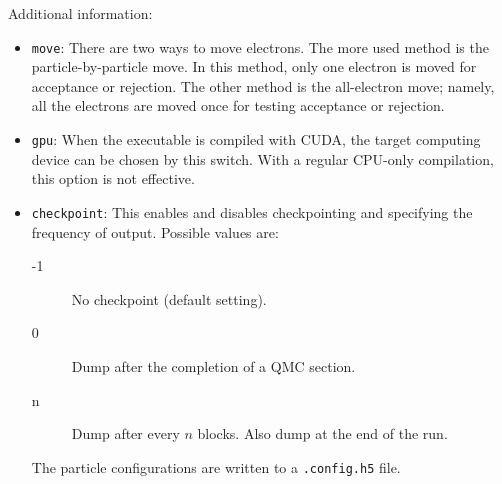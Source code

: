 Additional information:
\begin{itemize}
\item \texttt{move}: There are two ways to move electrons. The more used method is the particle-by-particle move. In this method, only one electron is moved for acceptance or rejection. The other method is the all-electron move; namely, all the electrons are moved once for testing acceptance or rejection.

\item \texttt{gpu}: When the executable is compiled with CUDA, the target computing device can be chosen by this switch. With a regular CPU-only compilation, this option is not effective.

\item \texttt{checkpoint}:
This enables and disables checkpointing and specifying the frequency of output.  Possible values are:
\begin{description}
\item [-1] No checkpoint (default setting).
\item [0] Dump after the completion of a QMC section.
\item [n] Dump after every $n$ blocks.  Also dump at the end of the run.
\end{description}


The particle configurations are written to a \texttt{.config.h5} file.







\end{itemize}

